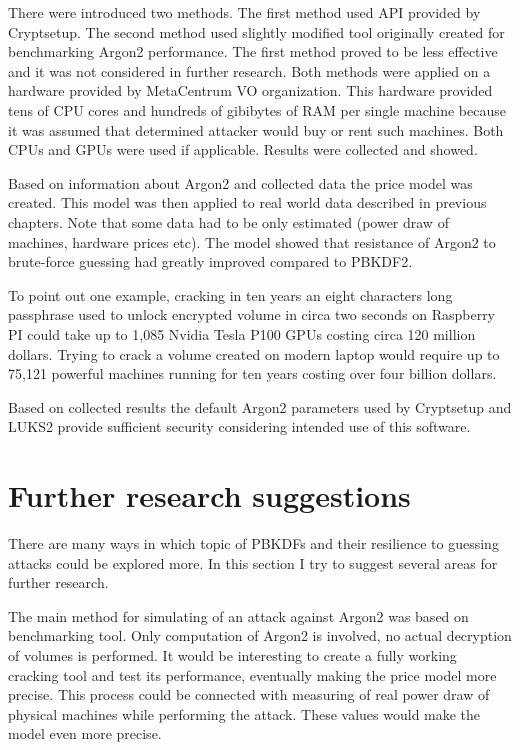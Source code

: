 \documentclass[nolof,digital]{fithesis3}
\begin{document}
There were introduced two methods. The first method used API provided by Cryptsetup. The second method used slightly modified tool originally created for benchmarking Argon2 performance. The first method proved to be less effective and it was not considered in further research. Both methods were applied on a hardware provided by MetaCentrum VO organization. This hardware provided tens of CPU cores and hundreds of gibibytes of RAM per single machine because it was assumed that determined attacker would buy or rent such machines. Both CPUs and GPUs were used if applicable. Results were collected and showed.

Based on information about Argon2 and collected data the price model was created. This model was then applied to real world data described in previous chapters. Note that some data had to be only estimated (power draw of machines, hardware prices etc). The model showed that resistance of Argon2 to brute-force guessing had greatly improved compared to PBKDF2.

To point out one example, cracking in ten years an eight characters long passphrase used to unlock encrypted volume in circa two seconds on Raspberry PI could take up to 1,085 Nvidia Tesla P100 GPUs costing circa 120 million dollars. Trying to crack a volume created on modern laptop would require up to 75,121 powerful machines running for ten years costing over four billion dollars.

Based on collected results the default Argon2 parameters used by Cryptsetup and LUKS2 provide sufficient security considering intended use of this software.

\section{Further research suggestions}
There are many ways in which topic of PBKDFs and their resilience to guessing attacks could be explored more. In this section I try to suggest several areas for further research.

The main method for simulating of an attack against Argon2 was based on benchmarking tool. Only computation of Argon2 is involved, no actual decryption of volumes is performed. It would be interesting to create a fully working cracking tool and test its performance, eventually making the price model more precise. This process could be connected with measuring of real power draw of physical machines while performing the attack. These values would make the model even more precise.
\end{document}
